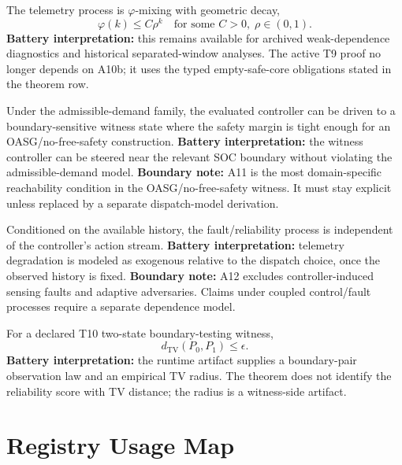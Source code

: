 \begin{assumption}\label{assum:A10b}
The telemetry process is $\varphi$-mixing with geometric decay,
\[
  \varphi(k)\le C\rho^k
  \quad \text{for some } C>0,\; \rho\in(0,1).
\]
\textbf{Battery interpretation:} this remains available for archived
weak-dependence diagnostics and historical separated-window analyses.  The
active T9 proof no longer depends on A10b; it uses the typed empty-safe-core
obligations stated in the theorem row.
\end{assumption}

\begin{assumption}\label{assum:A11}
Under the admissible-demand family, the evaluated controller can be driven to a
boundary-sensitive witness state where the safety margin is tight enough for an
OASG/no-free-safety construction.
\textbf{Battery interpretation:} the witness controller can be steered near the
relevant SOC boundary without violating the admissible-demand model.
\textbf{Boundary note:} A11 is the most domain-specific reachability condition
in the OASG/no-free-safety witness.  It must stay explicit unless replaced by a
separate dispatch-model derivation.
\end{assumption}

\begin{assumption}\label{assum:A12}
Conditioned on the available history, the fault/reliability process is
independent of the controller's action stream.
\textbf{Battery interpretation:} telemetry degradation is modeled as exogenous
relative to the dispatch choice, once the observed history is fixed.
\textbf{Boundary note:} A12 excludes controller-induced sensing faults and
adaptive adversaries.  Claims under coupled control/fault processes require a
separate dependence model.
\end{assumption}

\begin{assumption}\label{assum:A13}
For a declared T10 two-state boundary-testing witness,
\[
  d_{\mathrm{TV}}(P_0, P_1) \le \epsilon .
\]
\textbf{Battery interpretation:} the runtime artifact supplies a boundary-pair
observation law and an empirical TV radius.  The theorem does not identify the
reliability score with TV distance; the radius is a witness-side artifact.
\end{assumption}

\section{Registry Usage Map}

